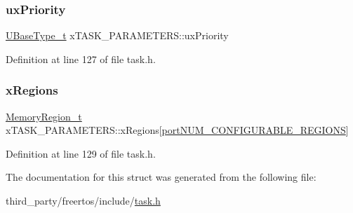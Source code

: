 \subsubsection{\texorpdfstring{ux\+Priority}{uxPriority}}
{\footnotesize\ttfamily \hyperlink{pic32mx_2portmacro_8h_a646f89d4298e4f5afd522202b11cb2e6}{U\+Base\+Type\+\_\+t} x\+T\+A\+S\+K\+\_\+\+P\+A\+R\+A\+M\+E\+T\+E\+R\+S\+::ux\+Priority}



Definition at line 127 of file task.\+h.

\mbox{\label{structxTASK__PARAMETERS_ae8b97c6b7a344bf09b066b0844844d66}} 
\subsubsection{\texorpdfstring{x\+Regions}{xRegions}}
{\footnotesize\ttfamily \hyperlink{task_8h_af609504de4d78ff6f71477ae47c66e51}{Memory\+Region\+\_\+t} x\+T\+A\+S\+K\+\_\+\+P\+A\+R\+A\+M\+E\+T\+E\+R\+S\+::x\+Regions\mbox{[}\hyperlink{portable_8h_aca7e1a8a568a38b74cc9db10c8efebda}{port\+N\+U\+M\+\_\+\+C\+O\+N\+F\+I\+G\+U\+R\+A\+B\+L\+E\+\_\+\+R\+E\+G\+I\+O\+NS}\mbox{]}}



Definition at line 129 of file task.\+h.



The documentation for this struct was generated from the following file\+:\begin{DoxyCompactItemize}
\item 
third\+\_\+party/freertos/include/\hyperlink{task_8h}{task.\+h}\end{DoxyCompactItemize}
